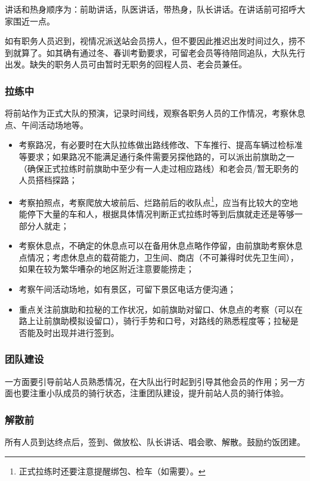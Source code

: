 \documentclass[UTF8]{ctexart}
\begin{document}
讲话和热身顺序为：前助讲话，队医讲话，带热身，队长讲话。在讲话前可招呼大家围近一点。

如有职务人员迟到，视情况派送站会员捞人，但不要因此推迟出发时间过久，捞不到就算了。如其确有通过冬、春训考勤要求，可留老会员等待陪同追队，大队先行出发。缺失的职务人员可由暂时无职务的回程人员、老会员兼任。

\subsubsection{拉练中}

将前站作为正式大队的预演，记录时间线，观察各职务人员的工作情况，考察休息点、午间活动场地等。

\begin{itemize}[nosep,left=4em]
    \item 考察路况，有必要时在大队拉练做出路线修改、下车推行、提高车辆过检标准等要求；如果路况不能满足通行条件需要另探他路的，可以派出前旗助之一（确保正式拉练时前旗助中至少有一人走过相应路线）和老会员/暂无职务的人员搭档探路；
    \item 考察拍照点，考察爬放大坡前后、烂路前后的收队点\footnote{正式拉练时还要注意提醒绑包、检车（如需要）。}，应当有比较大的空地能停下大量的车和人，根据具体情况判断正式拉练时等到后旗就走还是等够一部分人就走；
    \item 考察休息点，不确定的休息点可以在备用休息点略作停留，由前旗助考察休息点情况；考虑休息点的载荷能力，卫生间、商店（不可兼得时优先卫生间），如果在较为繁华嘈杂的地区附近注意要能捞走；
    \item 考察午间活动场地，如有景区，可留下景区电话方便沟通；
    \item 重点关注前旗助和拉秘的工作状况，如前旗助对留口、休息点的考察（可以在路上让前旗助模拟设留口），骑行手势和口号，对路线的熟悉程度等；拉秘是否能及时出现并进行签到。
\end{itemize}

\subsubsection{团队建设}

一方面要引导前站人员熟悉情况，在大队出行时起到引导其他会员的作用；另一方面也要注重小队成员的骑行状态，注重团队建设，提升前站人员的骑行体验。

\subsubsection{解散前}

所有人员到达终点后，签到、做放松、队长讲话、唱会歌、解散。鼓励约饭团建。
\end{document}

